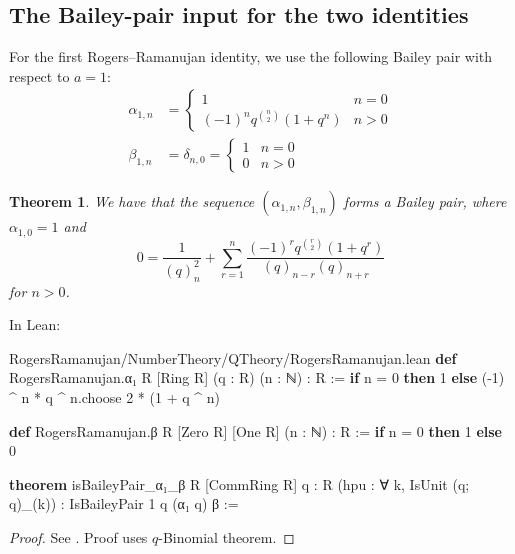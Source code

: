 \documentclass[12pt]{amsart}
\newtheorem{theorem}{Theorem}[subsection]
\theoremstyle{definition}
\theoremstyle{remark}
\numberwithin{equation}{subsection}
\newcommand{\kw}[1]{\textcolor{keywordcolor}{\textbf{#1}}}
\newcommand{\var}[1]{\textcolor{tacticcolor}{#1}}
\newcommand{\prop}[1]{\textcolor{sortcolor}{#1}}
\newcommand{\num}[1]{\textcolor{numcolor}{#1}}
\newcommand{\imp}[1]{\textcolor{commentcolor}{\textbraceleft#1\textbraceright}}
\begin{document}
\subsection{The Bailey-pair input for the two identities}

For the first Rogers--Ramanujan identity, we use the following Bailey pair with respect to $a = 1$:
\begin{align}
    \alpha_{1, n} &= \begin{cases}
        1 & n = 0 \\
        (-1)^n q^{\binom{n}{2}} (1 + q^n) & n > 0
    \end{cases} \\
    \beta_{1, n} &= \delta_{n,0} = \begin{cases} 1 & n = 0 \\ 0 & n > 0 \end{cases}
\end{align}

\begin{theorem}
    \label{thm:RR1-bailey-pair} We have that the sequence
    $(\alpha_{1,n}, \beta_{1,n})$ forms a Bailey pair, where $\alpha_{1,0} = 1$ and
    \begin{equation}
        0 =  \frac{1}{(q)_{n}^2} + \sum_{r=1}^{n} \frac{(-1)^r q^{\binom{r}{2}}(1 + q^r)}{(q)_{n-r}(q)_{n+r}}
    \end{equation}
    for $n > 0$.
\end{theorem}

In Lean:

\begin{code}{RogersRamanujan/NumberTheory/QTheory/RogersRamanujan.lean}
\kw{def} RogersRamanujan.α₁ \imp{R} [Ring \var{R}] (\var{q} : \var{R}) (\var{n} : ℕ) : \var{R} :=
  \kw{if} \var{n} = \num{0} \kw{then} \num{1} \kw{else} (-\num{1}) ^ \var{n} * \var{q} ^ \var{n}.\prop{choose} \num{2} * (\num{1} + \var{q} ^ \var{n})

\kw{def} RogersRamanujan.β \imp{R} [Zero \var{R}] [One \var{R}] (\var{n} : ℕ) : \var{R} := \kw{if} \var{n} = \num{0} \kw{then} \num{1} \kw{else} \num{0}

\kw{theorem} isBaileyPair_α₁_β \imp{R} [CommRing \var{R}] \imp{q : R} (\var{hpu} : ∀ \var{k}, IsUnit (\var{q}; \var{q})_(\var{k})) :
  IsBaileyPair \num{1} \var{q} (α₁ \var{q}) β :=
\end{code}
\begin{proof}
    See \cite[Section 3.5]{Andrews1986}.
    Proof uses $q$-Binomial theorem.
\end{proof}
\end{document}
